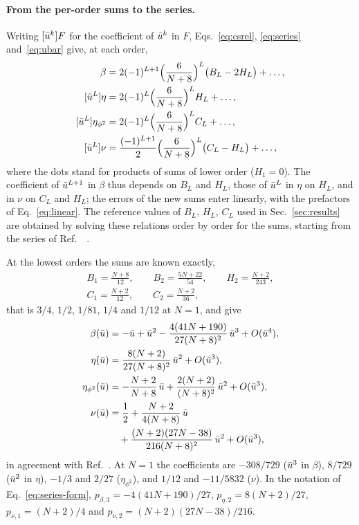\paragraph{From the per-order sums to the series.}
Writing $[\bar u^k]F$ for the coefficient of $\bar u^k$ in $F$, Eqs.~\eqref{eq:csrel}, \eqref{eq:series}
and~\eqref{eq:ubar} give, at each order,
\begin{align}
[\ubar^{L+1}]\beta&=2(-1)^{L+1}\Bigl(\frac{6}{N+8}\Bigr)^{L}\bigl(B_L-2H_L\bigr)+\dots,\nonumber\\
[\ubar^{L}]\eta&=2(-1)^{L}\Bigl(\frac{6}{N+8}\Bigr)^{L}H_L+\dots,\nonumber\\
[\ubar^{L}]\eta_{\phi^2}&=2(-1)^{L}\Bigl(\frac{6}{N+8}\Bigr)^{L}C_L+\dots,\label{eq:linear}\\
[\ubar^{L}]\nu&=\frac{(-1)^{L+1}}{2}\Bigl(\frac{6}{N+8}\Bigr)^{L}\bigl(C_L-H_L\bigr)+\dots,\nonumber
\end{align}
where the dots stand for products of sums of lower order ($H_1=0$). The coefficient of $\bar u^{L+1}$ in $\beta$ thus
depends on $B_L$ and $H_L$, those of $\bar u^{L}$ in $\eta$ on $H_L$, and in $\nu$ on $C_L$ and $H_L$; the errors of the
new sums enter linearly, with the prefactors of Eq.~\eqref{eq:linear}. The reference values of $B_L$, $H_L$, $C_L$ used
in Sec.~\ref{sec:results} are obtained by solving these relations order by order for the sums, starting from the
series of Ref.~\cite{Phi4tools2024}~.

At the lowest orders the sums are known exactly,
\begin{gather}
B_1=\frac{N+8}{12},\qquad B_2=\frac{5N+22}{54},\qquad H_2=\frac{N+2}{243},\nonumber\\
C_1=\frac{N+2}{12},\qquad C_2=\frac{N+2}{36},
\label{eq:exactsums}
\end{gather}
that is $3/4$, $1/2$, $1/81$, $1/4$ and $1/12$ at $N=1$, and give
\begin{align}
\beta(\bar u)&=-\bar u+\bar u^2-\frac{4(41N+190)}{27(N+8)^2}\,\bar u^3+O(\bar u^4),\nonumber\\
\eta(\bar u)&=\frac{8(N+2)}{27(N+8)^2}\,\bar u^2+O(\bar u^3),\nonumber\\
\eta_{\phi^2}(\bar u)&=-\frac{N+2}{N+8}\,\bar u+\frac{2(N+2)}{(N+8)^2}\,\bar u^2+O(\bar u^3),\label{eq:lowseries}\\
\nu(\bar u)&=\frac12+\frac{N+2}{4(N+8)}\,\bar u\nonumber\\
&\quad+\frac{(N+2)(27N-38)}{216(N+8)^2}\,\bar u^2+O(\bar u^3),\nonumber
\end{align}
in agreement with Ref.~\cite{Phi4tools2024}. At $N=1$ the coefficients are $-308/729$ ($\bar u^3$ in $\beta$),
$8/729$ ($\bar u^2$ in $\eta$), $-1/3$ and $2/27$ ($\eta_{\phi^2}$), and $1/12$ and $-11/5832$ ($\nu$). In the notation of
Eq.~\eqref{eq:series-form}, $p_{\beta,3}=-4(41N+190)/27$, $p_{\eta,2}=8(N+2)/27$, $p_{\nu,1}=(N+2)/4$ and
$p_{\nu,2}=(N+2)(27N-38)/216$.


